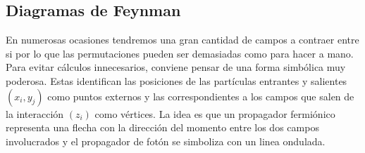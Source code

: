 \documentclass{article}
\numberwithin{equation}{section}
\begin{document}
%

\subsection{Diagramas de Feynman}\label{sec_feyn}

En numerosas ocasiones
tendremos una gran cantidad de campos a contraer entre si por lo que
las permutaciones pueden ser demasiadas como para hacer a mano. Para
evitar cálculos innecesarios, conviene pensar de una forma simbólica
muy poderosa. Estas identifican las posiciones de las partículas entrantes
y salientes $(x_{i},y_{j})$ como puntos externos y las correspondientes
a los campos que salen de la interacción $(z_{i})$ como vértices.
La idea es que un propagador fermiónico representa una flecha con
la dirección del momento entre los dos campos involucrados y el propagador
de fotón se simboliza con un linea ondulada. 
\end{document}
